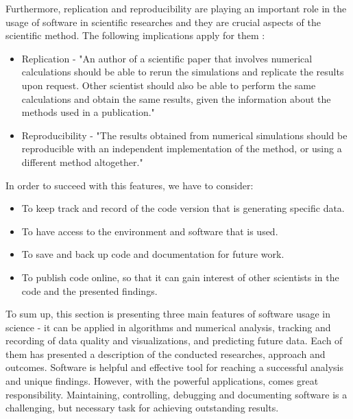 Furthermore, replication and reproducibility are playing an important role in the usage of software in scientific researches and they are crucial aspects of the scientific method. The following implications apply for them \cite{johansson2014introduction}\cite{peng2011reproducible}\cite{levequereproducible}:

\begin{itemize}
\item Replication - "An author of a scientific paper that involves numerical calculations should be able to
rerun the simulations and replicate the results upon request. Other scientist should also be able to
perform the same calculations and obtain the same results, given the information about the methods
used in a publication."\cite{johansson2014introduction}
\item Reproducibility - "The results obtained from numerical simulations should be reproducible with an
independent implementation of the method, or using a different method altogether."\cite{johansson2014introduction}
\end{itemize}

In order to succeed with this features, we have to consider:

\begin{itemize}
\item To keep track and record of the code version that is generating specific data.
\item To have access to the environment and software that is used.
\item To save and back up code and documentation for future work.
\item To publish code online, so that it can gain interest of other scientists in the code and the presented findings. \cite{johansson2014introduction}
\end{itemize}


To sum up, this section is presenting three main features of software usage in science - it can be applied in algorithms and numerical analysis, tracking and recording of data quality and visualizations, and predicting future data. Each of them has presented a description of the conducted researches, approach and outcomes. Software is helpful and effective tool for reaching a successful analysis and unique findings. However, with the powerful applications, comes great responsibility. Maintaining, controlling, debugging and documenting software is a challenging, but necessary task for achieving outstanding results. 